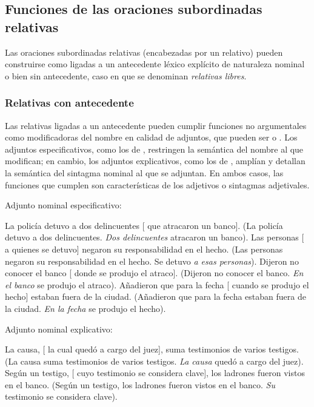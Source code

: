 \subsection{Funciones de las oraciones subordinadas relativas}\label{sec:13-funcrelativas}

Las oraciones subordinadas relativas (encabezadas por un relativo) pueden
construirse como ligadas a un antecedente léxico explícito de naturaleza nominal
o bien sin antecedente, caso en que se denominan \textit{relativas libres}.

\subsubsection{Relativas con antecedente}\label{sec:13-conantecedente}

Las relativas ligadas a un antecedente pueden cumplir funciones no argumentales
como modificadoras del nombre en calidad de adjuntos, que pueden ser
 o . Los adjuntos especificativos,
como los de , restringen la semántica del nombre al que
modifican; en cambio, los adjuntos explicativos, como los de ,
amplían y detallan la semántica del sintagma nominal al que se adjuntan. En ambos
casos, las funciones que cumplen son características de los adjetivos o
sintagmas adjetivales.

\begin{exe}
  \ex\label{ex:13-as} Adjunto nominal especificativo:
    \begin{xlist}
      \ex\label{ex:13-as-a} La policía detuvo a dos delincuentes [ que
          atracaron un banco]. (La policía detuvo a dos delincuentes. \textit{Dos
          delincuentes} atracaron un banco).
      \ex\label{ex:13-as-b} Las personas [ a quienes se detuvo]
          negaron su responsabilidad en el hecho. (Las personas negaron su
          responsabilidad en el hecho. Se detuvo \textit{a esas personas}).
      \ex\label{ex:13-as-c} Dijeron no conocer el banco [ donde se
          produjo el atraco]. (Dijeron no conocer el banco. \textit{En el banco}
          se produjo el atraco).
      \ex\label{ex:13-as-d} Añadieron que para la fecha [ cuando se
          produjo el hecho] estaban fuera de la ciudad. (Añadieron que para la
          fecha estaban fuera de la ciudad. \textit{En la fecha} se produjo el
          hecho).
    \end{xlist}
  \ex\label{ex:13-ax} Adjunto nominal explicativo:
    \begin{xlist}
      \ex\label{ex:13-ax-a} La causa, [ la cual quedó a cargo del
          juez], suma testimonios de varios testigos. (La causa suma testimonios
          de varios testigos. \textit{La causa} quedó a cargo del juez).
      \ex\label{ex:13-ax-b} Según un testigo, [ cuyo testimonio se
          considera clave], los ladrones fueron vistos en el banco. (Según un
          testigo, los ladrones fueron vistos en el banco. \textit{Su}
          testimonio se considera clave).
    \end{xlist}
\end{exe}

